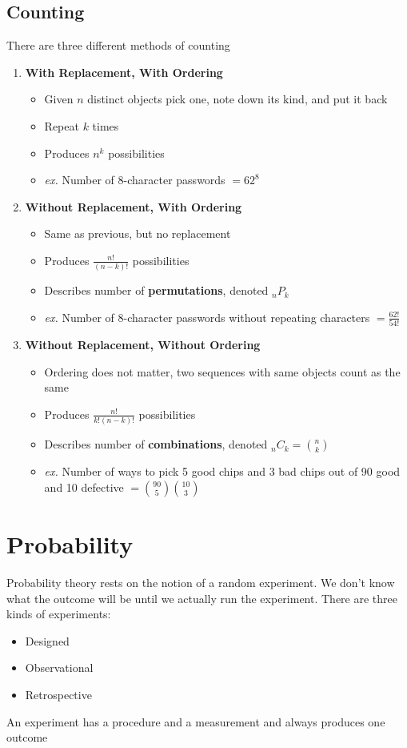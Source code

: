 \documentclass[11pt]{article}
\begin{document}
\subsection{Counting}
There are three different methods of counting
\begin{enumerate}
\item \textbf{With Replacement, With Ordering}
\begin{itemize}
\item Given $n$ distinct objects pick one, note down its kind, and put it back
\item Repeat $k$ times
\item Produces $n^k$ possibilities
\item \textit{ex.} Number of 8-character passwords $= 62^8$
\end{itemize}
\item \textbf{Without Replacement, With Ordering}
\begin{itemize}
\item Same as previous, but no replacement
\item Produces $\frac{n!}{(n-k)!}$ possibilities
\item Describes number of \textbf{permutations}, denoted $_nP_k$
\item \textit{ex.} Number of 8-character passwords without repeating characters $= \frac{62!}{54!}$
\end{itemize}
\bigskip
\item \textbf{Without Replacement, Without Ordering}
\begin{itemize}
\item Ordering does not matter, two sequences with same objects count as the same
\item Produces $\frac{n!}{k!(n-k)!}$ possibilities
\item Describes number of \textbf{combinations}, denoted $_nC_k = {n \choose k}$
\item \textit{ex.} Number of ways to pick 5 good chips and 3 bad chips out of 90 good and 10 defective $= {90 \choose 5}{ 10 \choose 3}$
\end{itemize}
\end{enumerate}

\pagebreak

\section{Probability}
Probability theory rests on the notion of a random experiment. We don't know what the outcome will be until we actually run the experiment. There are three kinds of experiments:
\begin{itemize}
\item Designed
\item Observational
\item Retrospective
\end{itemize}
An experiment has a procedure and a measurement and always produces one outcome
\end{document}
